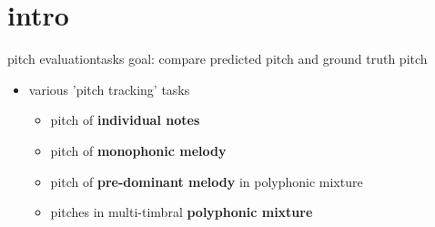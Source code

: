     \section[intro]{intro}
       \begin{frame}{pitch evaluation}{tasks}
            goal: compare predicted pitch and ground truth pitch
            \pause
            \begin{itemize}
                \item   various 'pitch tracking' tasks
                    \begin{itemize}
                        \item   pitch of \textbf{individual notes}
                        \item   pitch of \textbf{monophonic melody}
                        \item   pitch of \textbf{pre-dominant melody} in polyphonic mixture
                        \item   pitches in multi-timbral \textbf{polyphonic mixture}
                    \end{itemize}
             \end{itemize}
        \end{frame}
        
